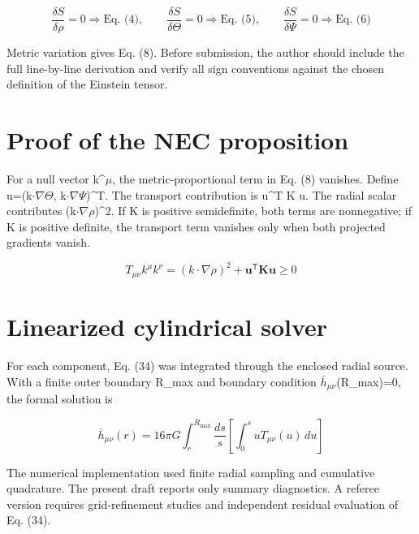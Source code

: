 \documentclass[aps,prd,preprint,nofootinbib,superscriptaddress]{revtex4-2}
\begin{document}
\begin{equation}
\frac{\delta S}{\delta\rho}=0\Rightarrow\text{Eq.~(4)},\qquad \frac{\delta S}{\delta\Theta}=0\Rightarrow\text{Eq.~(5)},\qquad \frac{\delta S}{\delta\Psi}=0\Rightarrow\text{Eq.~(6)}
\tag{A1}\label{eq:A1}
\end{equation}

Metric variation gives Eq. (8). Before submission, the author should include the full line-by-line derivation and verify all sign conventions against the chosen definition of the Einstein tensor.


\section{Proof of the NEC proposition}

For a null vector k\textasciicircum{}$\mu$, the metric-proportional term in Eq. (8) vanishes. Define u=(k$\cdot$$\nabla$$\Theta$, k$\cdot$$\nabla$$\Psi$)\textasciicircum{}T. The transport contribution is u\textasciicircum{}T K u. The radial scalar contributes (k$\cdot$$\nabla$$\rho$)\textasciicircum{}2. If K is positive semidefinite, both terms are nonnegative; if K is positive definite, the transport term vanishes only when both projected gradients vanish.


\begin{equation}
T_{\mu\nu}k^\mu k^\nu=(k\cdot\nabla\rho)^2+\mathbf u^{\mathsf T}\mathbf K\mathbf u\geq0
\tag{B1}\label{eq:B1}
\end{equation}

\section{Linearized cylindrical solver}

For each component, Eq. (34) was integrated through the enclosed radial source. With a finite outer boundary R\_max and boundary condition $\bar h_{\mu\nu}$(R\_max)=0, the formal solution is


\begin{equation}
\bar h_{\mu\nu}(r)=16\pi G\int_r^{R_{\max}}\frac{ds}{s}\left[\int_0^s uT_{\mu\nu}(u)\,du\right]
\tag{C1}\label{eq:C1}
\end{equation}

The numerical implementation used finite radial sampling and cumulative quadrature. The present draft reports only summary diagnostics. A referee version requires grid-refinement studies and independent residual evaluation of Eq. (34).
\end{document}
